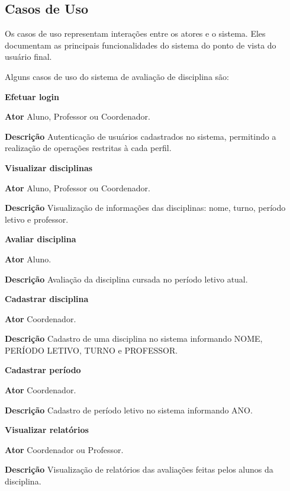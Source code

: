 \subsection{Casos de Uso}
Os casos de uso representam interações entre os atores e o sistema. Eles documentam as principais funcionalidades do sistema do ponto de vista do usuário final. 

Alguns casos de uso do sistema de avaliação de disciplina são:

\begin{alineas}
    \item \textbf{Efetuar login}
        \begin{alineas}
            \item \textbf{Ator} Aluno, Professor ou Coordenador.
            \item \textbf{Descrição} Autenticação de usuários cadastrados no sistema, permitindo a realização de operações restritas à cada perfil.
        \end{alineas}
    \item \textbf{Visualizar disciplinas}
        \begin{alineas}
            \item \textbf{Ator} Aluno, Professor ou Coordenador.
            \item \textbf{Descrição} Visualização de informações das disciplinas: nome, turno, período letivo e professor.
        \end{alineas}
    \item \textbf{Avaliar disciplina}
        \begin{alineas}
            \item \textbf{Ator} Aluno.
            \item \textbf{Descrição} Avaliação da disciplina cursada no período letivo atual.
        \end{alineas}
    \item \textbf{Cadastrar disciplina}
        \begin{alineas}
            \item \textbf{Ator} Coordenador.
            \item \textbf{Descrição} Cadastro de uma disciplina no sistema informando NOME, PERÍODO LETIVO, TURNO e PROFESSOR.
        \end{alineas}
    \item \textbf{Cadastrar período}
        \begin{alineas}
            \item \textbf{Ator} Coordenador.
            \item \textbf{Descrição} Cadastro de período letivo no sistema informando ANO.
        \end{alineas}
    \item \textbf{Visualizar relatórios}
        \begin{alineas}
            \item \textbf{Ator} Coordenador ou Professor.
            \item \textbf{Descrição} Visualização de relatórios das avaliações feitas pelos alunos da disciplina.
        \end{alineas}
\end{alineas}

